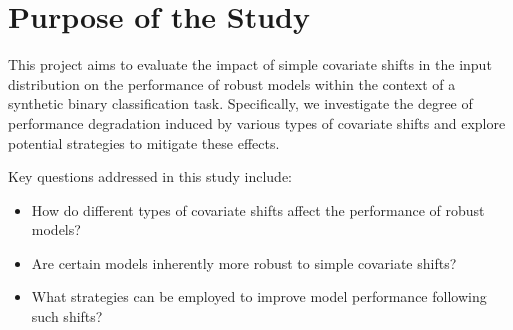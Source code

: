 \chapter*{Purpose of the Study}

\label{sec:purpose_of_the_study}
This project aims to evaluate the impact of simple covariate shifts in the input distribution on the performance of robust models within the context of a synthetic binary classification task. Specifically, we investigate the degree of performance degradation induced by various types of covariate shifts and explore potential strategies to mitigate these effects.

Key questions addressed in this study include:
\begin{itemize}
    \item How do different types of covariate shifts affect the performance of robust models?
    \item Are certain models inherently more robust to simple covariate shifts?
    \item What strategies can be employed to improve model performance following such shifts?
\end{itemize}

